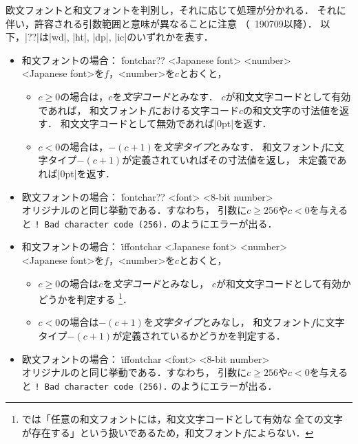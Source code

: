 \documentclass[a4paper,11pt,nomag]{jsarticle}
\begin{document}
\begin{cslist}
  欧文フォントと和文フォントを判別し，それに応じて処理が分かれる．
  それに伴い，許容される引数範囲と意味が異なることに注意
  （\epTeX~190709以降）．
  以下，|??|は|wd|, |ht|, |dp|, |ic|のいずれかを表す．
  \begin{itemize}
    \item 和文フォントの場合： \.{fontchar??} <Japanese font> <number>\\
      <Japanese font>を$f$，<number>を$c$とおくと，
      \begin{itemize}
        \item $c \geq 0$の場合は，$c$を\emph{文字コード}とみなす．
          $c$が和文文字コードとして有効であれば，
          和文フォント$f$における文字コード$c$の和文文字の寸法値を返す．
          和文文字コードとして無効であれば|0pt|を返す．
        \item $c < 0$の場合は，$-(c+1)$を\emph{文字タイプ}とみなす．
          和文フォント$f$に文字タイプ$-(c+1)$が定義されていればその寸法値を返し，
          未定義であれば|0pt|を返す．
      \end{itemize}
    \item 欧文フォントの場合： \.{fontchar??} <font> <8-bit number>\\
      オリジナルの\eTeX と同じ挙動である．すなわち，
      引数に$c \geq 256$や$c < 0$を与えると
      \verb+! Bad character code (256).+
      のようにエラーが出る．
  \end{itemize}

  \begin{itemize}
    \item 和文フォントの場合： \.{iffontchar} <Japanese font> <number>\\
      <Japanese font>を$f$，<number>を$c$とおくと，
      \begin{itemize}
        \item $c \geq 0$の場合は$c$を\emph{文字コード}とみなし，
          $c$が和文文字コードとして有効かどうかを判定する
          \footnote{\pTeX では「任意の和文フォントには，和文文字コードとして有効な
          全ての文字が存在する」という扱いであるため，和文フォント$f$によらない．}．
        \item $c < 0$の場合は$-(c+1)$を\emph{文字タイプ}とみなし，
          和文フォント$f$に文字タイプ$-(c+1)$が定義されているかどうかを判定する．
      \end{itemize}
    \item 欧文フォントの場合： \.{iffontchar} <font> <8-bit number>\\
      オリジナルの\eTeX と同じ挙動である．すなわち，
      引数に$c \geq 256$や$c < 0$を与えると
      \verb+! Bad character code (256).+
      のようにエラーが出る．
  \end{itemize}
\end{cslist}
\end{document}
